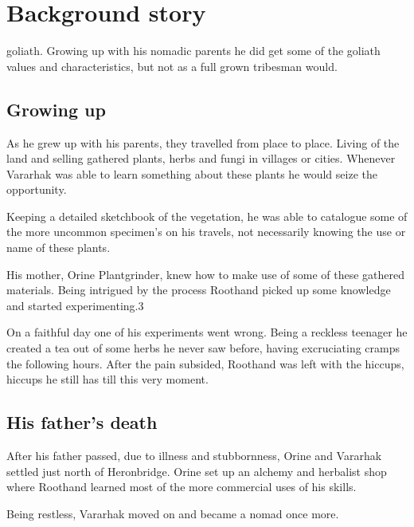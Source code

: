 \chapter{Background story}
\label{background}

 goliath. Growing up with his nomadic parents he did get some of the goliath values and characteristics, but not as a full grown tribesman would.

\section{Growing up}
As he grew up with his parents, they travelled from place to place. Living of the land and selling gathered plants, herbs and fungi in villages or cities. Whenever Vararhak was able to learn something about these plants he would seize the opportunity.

Keeping a detailed sketchbook of the vegetation, he was able to catalogue some of the more uncommon specimen's on his travels, not necessarily knowing the use or name of these plants.

His mother, Orine Plantgrinder, knew how to make use of some of these gathered materials. Being intrigued by the process Roothand picked up some knowledge and started experimenting.3 

On a faithful day one of his experiments went wrong. Being a reckless teenager he created a tea out of some herbs he never saw before, having excruciating cramps the following hours. After the pain subsided, Roothand was left with the hiccups, hiccups he still has till this very moment.

\section{His father's death}
After his father passed, due to illness and stubbornness, Orine and Vararhak settled just north of Heronbridge. Orine set up an alchemy and herbalist shop where Roothand learned most of the more commercial uses of his skills.

Being restless, Vararhak moved on and became a nomad once more.


